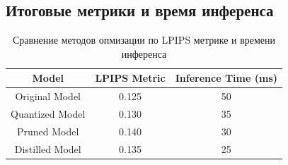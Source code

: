 \documentclass[14pt]{article}
\begin{document}
\subsection{Итоговые метрики и время инференса}


\begin{table}[H]
    \centering
    \begin{tabular}{|c|c|c|}
        \hline
        \textbf{Model} & \textbf{LPIPS Metric} & \textbf{Inference Time (ms)} \\ \hline
        Original Model & 0.125 & 50 \\ \hline
        Quantized Model & 0.130 & 35 \\ \hline
        Pruned Model & 0.140 & 30 \\ \hline
        Distilled Model & 0.135 & 25 \\ \hline
    \end{tabular}
    \caption{Сравнение методов опмизации по LPIPS метрике и времени инференса}
    \label{tab:lpips_inference_comparison}
\end{table}


\pagebreak
\printbibliography
\end{document}
